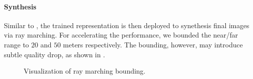 \paragraph{Synthesis}
Similar to \cite{mildenhall2020nerf}, the trained representation is then deployed to synethesis final images via ray marching. For accelerating the performance, we bounded the near/far range to $20$ and $50$ meters respectively. The bounding, however, may introduce subtle quality drop, as shown in .
\begin{figure}
    \centering
    \hspace{1em}
    \caption{Visualization of ray marching bounding.}
    \label{fig:method:bounding}
\end{figure}

